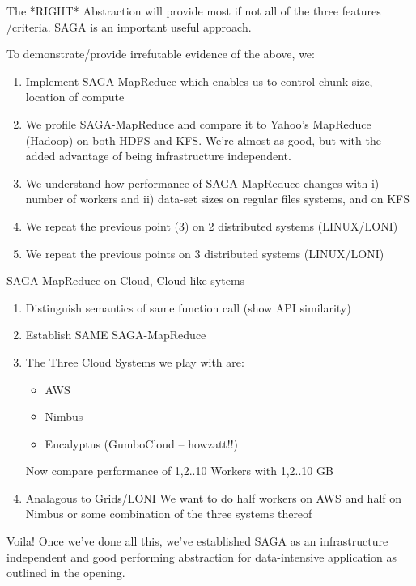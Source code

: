 \documentclass[conference,final]{IEEEtran}
\begin{document}
The *RIGHT* Abstraction will provide most if not all of the three features
/criteria. SAGA is an important useful approach.

To demonstrate/provide irrefutable evidence of the above, we:
\begin{enumerate}
\item Implement SAGA-MapReduce
   which enables us to control chunk size, location of compute

\item We profile SAGA-MapReduce and compare it to Yahoo's MapReduce
   (Hadoop) on both HDFS and KFS. We're almost as good, but with the
   added advantage of being infrastructure independent.

\item We understand how performance of SAGA-MapReduce changes with
  i) number of workers and ii) data-set sizes
   on regular files systems, and on KFS

\item  We repeat the previous point (3) on 2 distributed systems (LINUX/LONI)

\item We repeat the previous points on 3 distributed systems (LINUX/LONI)
\end{enumerate}

SAGA-MapReduce on Cloud, Cloud-like-sytems

\begin{enumerate}

\item Distinguish semantics of same function call (show API similarity)

\item Establish SAME SAGA-MapReduce

\item  The Three Cloud Systems we play with are:
\begin{itemize}
\item AWS
\item Nimbus
\item Eucalyptus (GumboCloud -- howzatt!!)
\end{itemize}
Now compare performance of 1,2..10 Workers with 1,2..10 GB

\item Analagous to Grids/LONI We want to do half workers on AWS and half 
on Nimbus or some combination of the three systems thereof
\end{enumerate}

Voila! Once we've done all this, we've established SAGA as an
infrastructure independent and good performing abstraction for
data-intensive application as outlined in the opening.
\end{document}
